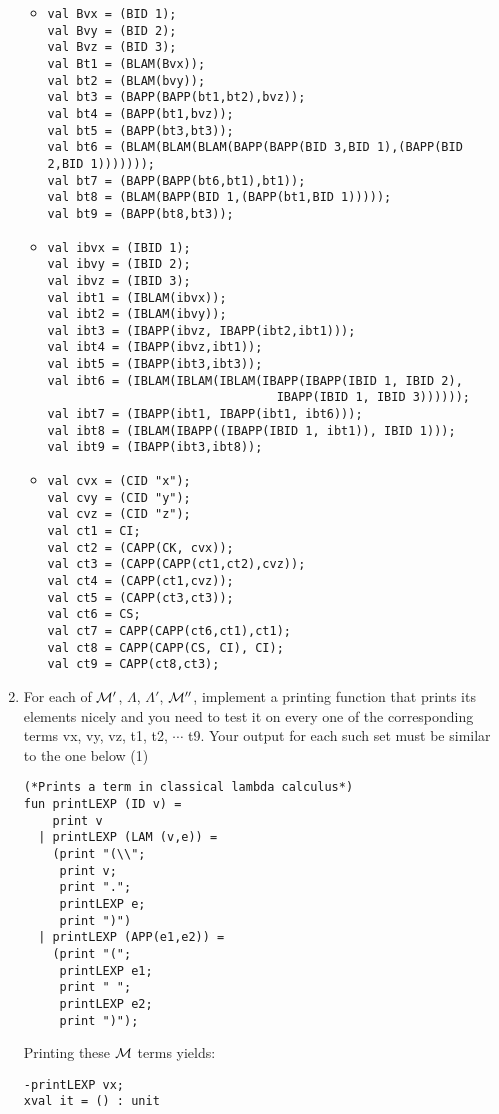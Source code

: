 \documentclass[11pt]{article}
\newcommand \cM {\cal M}
\begin{document}
\begin{enumerate}
\begin{itemize}
	      	\item
	      	      \begin{verbatim}
val Bvx = (BID 1);
val Bvy = (BID 2);
val Bvz = (BID 3);
val Bt1 = (BLAM(Bvx));
val bt2 = (BLAM(bvy));
val bt3 = (BAPP(BAPP(bt1,bt2),bvz));
val bt4 = (BAPP(bt1,bvz)); 
val bt5 = (BAPP(bt3,bt3)); 
val bt6 = (BLAM(BLAM(BLAM(BAPP(BAPP(BID 3,BID 1),(BAPP(BID 2,BID 1))))))); 
val bt7 = (BAPP(BAPP(bt6,bt1),bt1));
val bt8 = (BLAM(BAPP(BID 1,(BAPP(bt1,BID 1)))));
val bt9 = (BAPP(bt8,bt3));
	      	      \end{verbatim}
	      	\item
	      	      \begin{verbatim}
val ibvx = (IBID 1);
val ibvy = (IBID 2);
val ibvz = (IBID 3);
val ibt1 = (IBLAM(ibvx));
val ibt2 = (IBLAM(ibvy));
val ibt3 = (IBAPP(ibvz, IBAPP(ibt2,ibt1)));
val ibt4 = (IBAPP(ibvz,ibt1)); 
val ibt5 = (IBAPP(ibt3,ibt3)); 
val ibt6 = (IBLAM(IBLAM(IBLAM(IBAPP(IBAPP(IBID 1, IBID 2),
                                IBAPP(IBID 1, IBID 3))))));
val ibt7 = (IBAPP(ibt1, IBAPP(ibt1, ibt6)));
val ibt8 = (IBLAM(IBAPP((IBAPP(IBID 1, ibt1)), IBID 1)));
val ibt9 = (IBAPP(ibt3,ibt8)); 
	      	      \end{verbatim}
	      	\item
	      	      \begin{verbatim}
val cvx = (CID "x");
val cvy = (CID "y");
val cvz = (CID "z");
val ct1 = CI; 
val ct2 = (CAPP(CK, cvx));
val ct3 = (CAPP(CAPP(ct1,ct2),cvz));
val ct4 = (CAPP(ct1,cvz));
val ct5 = (CAPP(ct3,ct3));
val ct6 = CS;
val ct7 = CAPP(CAPP(ct6,ct1),ct1);
val ct8 = CAPP(CAPP(CS, CI), CI);
val ct9 = CAPP(ct8,ct3);
	      	      \end{verbatim}
	      \end{itemize}
	      \color{black}
	\item
	      For each of $\cM'$, $\Lambda$, $\Lambda'$, $\cM''$, implement a printing function that prints its elements nicely and you need to test it on every one of the corresponding terms  vx, vy, vz, t1, t2, $\cdots$ t9.  Your output for each such set must be similar to the one below \hfill{(1)} %
	        
	      
	      
	      \noindent
	      \begin{verbatim}
(*Prints a term in classical lambda calculus*)
fun printLEXP (ID v) =
    print v
  | printLEXP (LAM (v,e)) =
    (print "(\\";
     print v;
     print ".";
     printLEXP e;
     print ")")
  | printLEXP (APP(e1,e2)) =
    (print "(";
     printLEXP e1;
     print " ";
     printLEXP e2;
     print ")");
	      \end{verbatim}  
	      Printing these  $\cM$ terms yields:
	      \begin{verbatim}
-printLEXP vx;
xval it = () : unit


\end{verbatim}
\end{enumerate}
\end{document}
